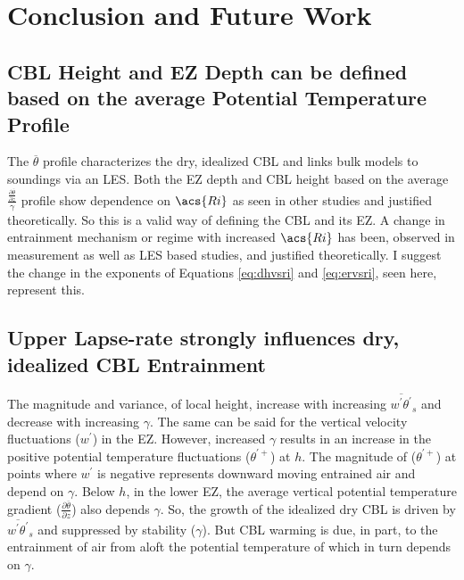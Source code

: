 
\chapter{Conclusion and Future Work}
\label{ch:conc}
\setlength{\parindent}{0cm}

\section{\acs{CBL} Height and \acs{EZ} Depth can be defined based on the average Potential Temperature Profile}

The $\overline{\theta}$ profile characterizes the dry, idealized \acs{CBL} and links bulk models to soundings via an \acs{LES}.  Both the \acs{EZ} depth and \acs{CBL} height based on the average $\frac{\frac{\partial \overline{\theta}}{\partial z}}{\gamma}$ profile show dependence on $\acs{Ri}$ as seen in other studies and justified theoretically.  So this is a valid way of defining the \acs{CBL} and its \acs{EZ}.  A change in entrainment mechanism or regime with increased $\acs{Ri}$ has been, observed in measurement as well as \acs{LES} based studies, and justified theoretically. I suggest the change in the exponents of Equations \ref{eq:dhvsri} and \ref{eq:ervsri}, seen here, represent this.\\

\section{Upper Lapse-rate strongly influences dry, idealized \acs{CBL} Entrainment}

The magnitude and variance, of local height, increase with increasing $\overline{w^{'}\theta^{'}}_{s}$ and decrease with increasing $\gamma$.  The same can be said for the vertical velocity fluctuations ($w^{'}$) in the \acs{EZ}.  However, increased $\gamma$ results in an increase in the positive potential temperature fluctuations ($\theta^{'+}$) at $h$. The magnitude of ($\theta^{'+}$) at points where $w^{'}$ is negative represents downward moving entrained air and depend on $\gamma$.  Below $h$, in the lower \acs{EZ}, the average vertical potential temperature gradient ($\frac{\partial \overline{\theta}}{\partial z}$) also depends $\gamma$. So, the growth of the idealized dry \acs{CBL} is driven by $\overline{w^{'}\theta^{'}}_{s}$ and suppressed by stability ($\gamma$). But \acs{CBL} warming is due, in part, to the entrainment of air from aloft the potential temperature of which in turn depends on $\gamma$.\\

